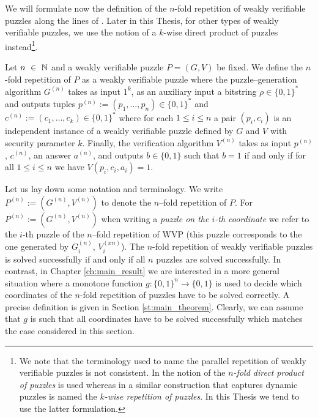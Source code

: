 We will formulate now the definition of the $n$-fold repetition of weakly verifiable puzzles along the lines of \cite{canetti2004hardness}.
Later in this Thesis, for other types of weakly verifiable puzzles, we use the notion of a $k$-wise direct product of puzzles instead\footnote{We
note that the terminology used to name the parallel repetition of weakly verifiable puzzles is not consistent.
In \cite{canetti2004hardness} the notion of the \textit{$n$-fold direct product of puzzles} is used whereas in \cite{Dodis:2009:SAI:1530441.1530450}
a similar construction that captures dynamic puzzles is named the \textit{$k$-wise repetition of puzzles}.
In this Thesis we tend to use the latter formulation.}.
%
\begin{definition}
  \label{def:n-fold-rep}
  Let $n~\in~\mathbb{N}$ and a weakly verifiable puzzle $P = (G,V)$ be fixed.
  We define the $n$-fold repetition of $P$ as a weakly verifiable puzzle where the puzzle--generation algorithm
  $G^{(n)}$ takes as input $1^k$, as an auxiliary input a bitstring $\rho \in \{0,1\}^{*}$
  and outputs tuples $p^{(n)} := (p_1, \dotsc, p_n) \in \{0,1\}^{*}$ and $c^{(n)} := (c_1, \dotsc, c_k) \in \{0,1\}^{*}$
  where for each $1 \leq i \leq n$ a pair $(p_i, c_i)$ is an independent instance of a weakly verifiable puzzle defined by $G$ and $V$ with security parameter $k$.
  Finally, the verification algorithm $V^{(n)}$ takes as input $p^{(n)}$, $c^{(n)}$, an answer $a^{(n)}$, and outputs $b \in \{0,1\}$
  such that $b = 1$ if and only if for all $1 \leq i \leq n$ we have $V(p_i, c_i, a_i) = 1$.
 \end{definition}
%
Let us lay down some notation and terminology. We write $P^{(n)} := (G^{(n)}, V^{(n)})$ to denote the $n$--fold repetition of $P$.
For $P^{(n) } := (G^{(n)},V^{(n)})$ when writing a \textit{puzzle on the $i$-th coordinate} we refer to the $i$-th puzzle of the $n$--fold repetition of WVP
(this puzzle corresponds to the one generated by $G^{(n)}_i$,  $V^{(xn)}_i$).
The $n$-fold repetition of weakly verifiable puzzles is solved successfully if and only if all $n$ puzzles are solved successfully.
In contrast, in Chapter \ref{ch:main_result} we are interested in a more general situation where a monotone function $g: \{0,1\}^{n} \rightarrow \{0,1\}$ is used to decide
which coordinates of the $n$-fold repetition of puzzles have to be solved correctly. A precise definition is given in Section \ref{st:main_theorem}.
Clearly, we can assume that $g$ is such that all coordinates have to be solved successfully which matches the case considered in this section.


